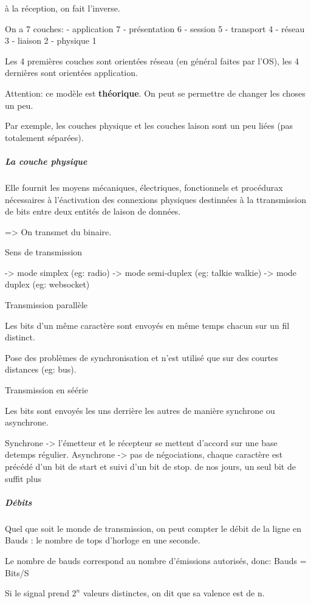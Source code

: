 à la réception, on fait l'inverse.

On a 7 couches: - application 7 - présentation 6 - session 5 - transport
4 - réseau 3 - liaison 2 - physique 1

Les 4 premières couches sont orientées réseau (en général faites par
l'OS), les 4 dernières sont orientées application.

Attention: ce modèle est \textbf{théorique}. On peut se permettre de
changer les choses un peu.

Par exemple, les couches physique et les couches laison sont un peu
liées (pas totalement séparées).

\hypertarget{la-couche-physique}{%
\subparagraph{La couche physique}\label{la-couche-physique}}

Elle fournit les moyens mécaniques, électriques, fonctionnels et
procédurax nécessaires à l'éactivation des connexions physiques
destinnées à la ttransmission de bits entre deux entités de laison de
données.

=\textgreater{} On transmet du binaire.

Sens de transmission

-\textgreater{} mode simplex (eg: radio) -\textgreater{} mode
semi-duplex (eg: talkie walkie) -\textgreater{} mode duplex (eg:
websocket)

Transmission parallèle

Les bits d'un même caractère sont envoyés en même temps chacun sur un
fil distinct.

Pose des problèmes de synchronisation et n'est utilisé que sur des
courtes distances (eg: bus).

Transmission en séérie

Les bits sont envoyés les uns derrière les autres de manière synchrone
ou asynchrone.

Synchrone -\textgreater{} l'émetteur et le récepteur se mettent d'accord
sur une base detemps régulier. Asynchrone -\textgreater{} pas de
négociations, chaque caractère est précédé d'un bit de start et suivi
d'un bit de stop. de nos jours, un seul bit de suffit plus

\hypertarget{duxe9bits}{%
\subparagraph{Débits}\label{duxe9bits}}

Quel que soit le monde de transmission, on peut compter le débit de la
ligne en Bauds : le nombre de tops d'horloge en une seconde.

Le nombre de bauds correspond au nombre d'émissions autorisés, donc:
Bauds = Bits/S

Si le signal prend \(2^n\) valeurs distinctes, on dit que sa valence est
de n.
